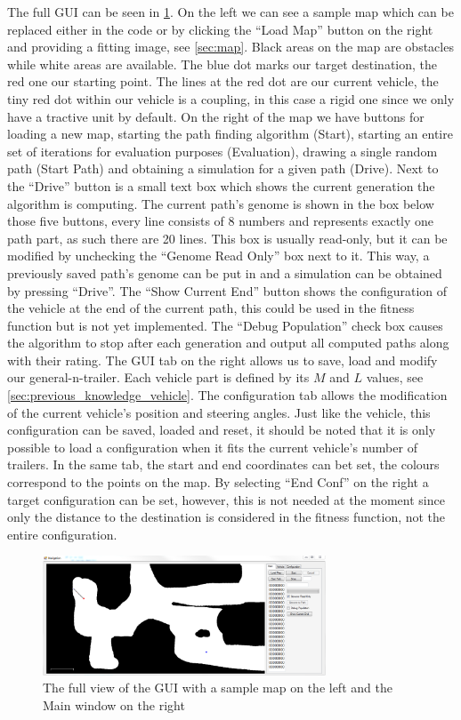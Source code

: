 The full GUI can be seen in \ref{pic:gui_full_main}. On the left we can see a sample map which can be replaced either in the code or by clicking the "`Load Map"' button on the right and providing a fitting image, see \ref{sec:map}. Black areas on the map are obstacles while white areas are available. The blue dot marks our target destination, the red one our starting point. The lines at the red dot are our current vehicle, the tiny red dot within our vehicle is a coupling, in this case a rigid one since we only have a tractive unit by default. On the right of the map we have buttons for loading a new map, starting the path finding algorithm (Start), starting an entire set of iterations for evaluation purposes (Evaluation), drawing a single random path (Start Path) and obtaining a simulation for a given path (Drive). Next to the "`Drive"' button is a small text box which shows the current generation the algorithm is computing. The current path's genome is shown in the box below those five buttons, every line consists of 8 numbers and represents exactly one path part, as such there are 20 lines. This box is usually read-only, but it can be modified by unchecking the "`Genome Read Only"' box next to it. This way, a previously saved path's genome can be put in and a simulation can be obtained by pressing "`Drive"'. The "`Show Current End"' button shows the configuration of the vehicle at the end of the current path, this could be used in the fitness function but is not yet implemented. The "`Debug Population"' check box causes the algorithm to stop after each generation and output all computed paths along with their rating. 
The GUI tab on the right allows us to save, load and modify our general-n-trailer. Each vehicle part is defined by its $M$ and $L$ values, see \ref{sec:previous_knowledge_vehicle}. 
The configuration tab allows the modification of the current vehicle's position and steering angles. Just like the vehicle, this configuration can be saved, loaded and reset, it should be noted that it is only possible to load a configuration when it fits the current vehicle's number of trailers. In the same tab, the start and end coordinates can bet set, the colours correspond to the points on the map. By selecting "`End Conf"' on the right a target configuration can be set, however, this is not needed at the moment since only the distance to the destination is considered in the fitness function, not the entire configuration.

\begin{figure}[b]
\centering
\includegraphics[width=0.75\textwidth]{./Chapters/Figures/gui_full_main.png}
\caption{The full view of the GUI with a sample map on the left and the Main window on the right\label{pic:gui_full_main}}
\end{figure}
